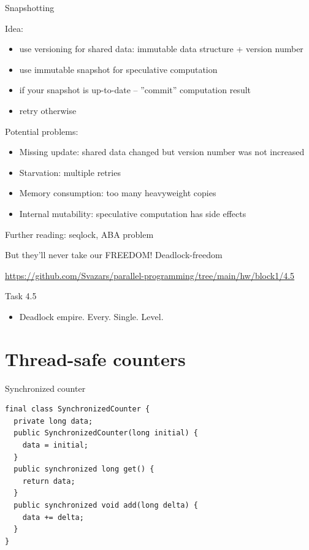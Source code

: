 \begin{frame}[t,fragile]{Snapshotting}

Idea: 
\begin{itemize}
    \item use versioning for shared data: immutable data structure + version number
    \item use immutable snapshot for speculative computation
    \item if your snapshot is up-to-date -- ''commit'' computation result
    \item retry otherwise    
\end{itemize}

Potential problems:
\begin{itemize}
    \item Missing update: shared data changed but version number was not increased
    \item Starvation: multiple retries
    \item Memory consumption: too many heavyweight copies
    \item Internal mutability: speculative computation has side effects
\end{itemize}

Further reading: seqlock, ABA problem
\end{frame}

\begin{frame}[t,fragile]{But they'll never take our FREEDOM! Deadlock-freedom}

{\small\url{https://github.com/Svazars/parallel-programming/tree/main/hw/block1/4.5}}
\begin{homeworkmail}{Task 4.5}
    \begin{itemize}
        \item Deadlock empire. Every. Single. Level.
    \end{itemize}
\end{homeworkmail}
\end{frame}


\section{Thread-safe counters}
\showTOCSub

\begin{frame}[t,fragile]{Synchronized counter}

\begin{verbatim}
final class SynchronizedCounter {
  private long data;
  public SynchronizedCounter(long initial) { 
    data = initial; 
  }
  public synchronized long get() { 
    return data; 
  }
  public synchronized void add(long delta) { 
    data += delta; 
  }
}
\end{verbatim}
\end{frame}

